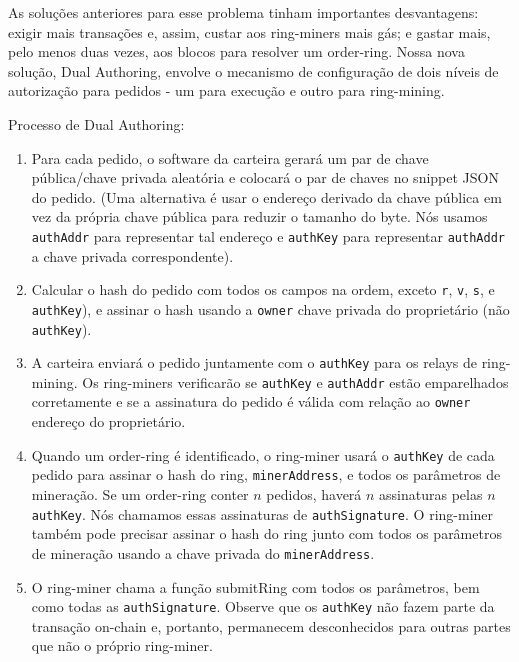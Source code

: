 \documentclass[UTF8,nofonts]{article}
\begin{document}
\begin{multicols}{2}
As soluções anteriores para esse problema tinham importantes desvantagens: exigir mais transações e, assim, custar aos ring-miners mais gás; e gastar mais, pelo menos duas vezes, aos blocos para resolver um order-ring.  Nossa nova solução, Dual Authoring\cite{dualauthor}, envolve o mecanismo de configuração de dois níveis de autorização para pedidos - um para execução e outro para ring-mining.

Processo de Dual Authoring:

\begin{enumerate}

	\item Para cada pedido, o software da carteira gerará
um par de chave pública/chave privada aleatória e colocará o par de chaves no snippet JSON do pedido. (Uma alternativa é usar o endereço derivado da chave pública em vez da própria chave pública para reduzir o tamanho do byte. Nós usamos \verb|authAddr| para representar tal endereço e \verb|authKey| para representar \verb|authAddr| a chave privada correspondente).

	\item Calcular o hash do pedido com todos os campos na ordem, exceto \verb|r|, \verb|v|, \verb|s|, e \verb|authKey|), e assinar o hash usando a  \verb|owner| chave privada do proprietário (não \verb|authKey|).

	\item A carteira enviará o pedido juntamente com o \verb|authKey| para os relays de ring-mining. Os ring-miners verificarão se  \verb|authKey| e \verb|authAddr| estão emparelhados corretamente e se a assinatura do pedido é válida com relação ao \verb|owner| endereço do proprietário.

	\item Quando um order-ring é identificado, o ring-miner usará o \verb|authKey| de cada pedido para assinar o hash do ring, \verb|minerAddress|, e todos os parâmetros de mineração. Se um order-ring conter $n$ pedidos, haverá $n$ assinaturas pelas $n$ \verb|authKey|. Nós chamamos essas assinaturas de \verb|authSignature|. O ring-miner também pode precisar assinar o hash do ring junto com todos os parâmetros de mineração usando a chave privada do \verb|minerAddress|.

	\item O ring-miner chama a função submitRing com
todos os parâmetros, bem como todas as \verb|authSignature|. Observe que os \verb|authKey| não fazem parte da transação on-chain e, portanto, permanecem desconhecidos para outras partes que não o próprio ring-miner.



\end{enumerate}
\end{multicols}
\end{document}
